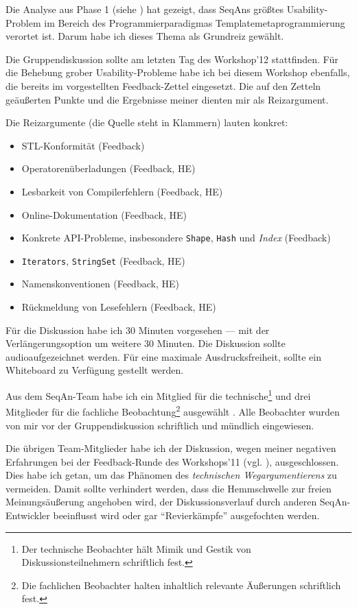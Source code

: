 Die Analyse aus Phase 1 (siehe ) hat gezeigt, dass SeqAns größtes Usability-Problem im Bereich des Programmierparadigmas Templatemetaprogrammierung verortet ist. Darum habe ich dieses Thema als Grundreiz gewählt.

Die Gruppendiskussion sollte am letzten Tag des Workshop'12 stattfinden. Für die Behebung grober Usability-Probleme habe ich bei diesem Workshop ebenfalls, die bereits im  vorgestellten Feedback-Zettel eingesetzt. Die auf den Zetteln geäußerten Punkte und die Ergebnisse meiner  dienten mir als Reizargument.

Die Reizargumente (die Quelle steht in Klammern) lauten konkret:
\begin{itemize}
  \item STL-Konformität (Feedback)
  \item Operatorenüberladungen (Feedback, HE)
  \item Lesbarkeit von Compilerfehlern (Feedback, HE)
  \item Online-Dokumentation (Feedback, HE)
  \item Konkrete API-Probleme, insbesondere \texttt{Shape}, \texttt{Hash} und \textit{Index} (Feedback)
  \item \texttt{Iterators}, \texttt{StringSet} (Feedback, HE)
  \item Namenskonventionen (Feedback, HE)
  \item Rückmeldung von Lesefehlern (Feedback, HE)
\end{itemize}

Für die Diskussion habe ich 30 Minuten vorgesehen --- mit der Verlängerungsoption um weitere 30 Minuten. Die Diskussion sollte audioaufgezeichnet werden. Für eine maximale Ausdrucksfreiheit, sollte ein Whiteboard zu Verfügung gestellt werden.

Aus dem SeqAn-Team habe ich ein Mitglied für die technische\footnote{Der technische Beobachter hält Mimik und Gestik von Diskussionsteilnehmern schriftlich fest.} und drei Mitglieder für die fachliche Beobachtung\footnote{Die fachlichen Beobachter halten inhaltlich relevante Äußerungen schriftlich fest.} ausgewählt \citep[Details siehe][]{mayring2002einfhrung}. Alle Beobachter wurden von mir vor der Gruppendiskussion schriftlich und mündlich eingewiesen.

Die übrigen Team-Mitglieder habe ich der Diskussion, wegen meiner negativen Erfahrungen bei der Feedback-Runde des Workshops'11 (vgl. ), ausgeschlossen. Dies habe ich getan, um das Phänomen des \textit{technischen Wegargumentierens} zu vermeiden. Damit sollte verhindert werden, dass die Hemmschwelle zur freien Meinungsäußerung angehoben wird, der Diskussionsverlauf durch anderen SeqAn-Entwickler beeinflusst wird oder gar ``Revierkämpfe'' ausgefochten werden.

